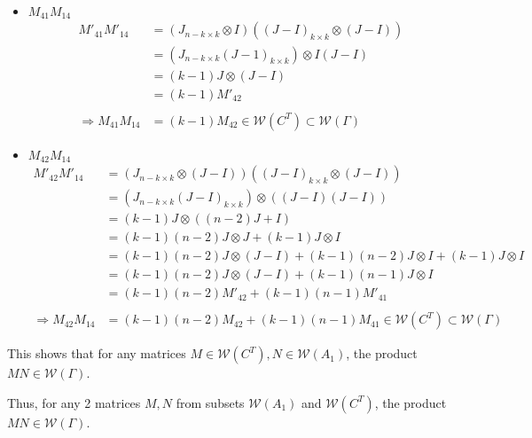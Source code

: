 \documentclass{article}
\begin{document}
\begin{itemize}
\begin{itemize}
\begin{itemize}
            \item $M_{41}M_{14}$ \\
            \begin{align*}
                M'_{41}M'_{14}
                &= (J_{n-k\times k}\otimes I)((J-I)_{k\times k}\otimes (J-I)) \\
                &= (J_{n-k\times k}(J-1)_{k\times k})\otimes I(J-I) \\
                &= (k-1)J\otimes (J-I)\\
                &= (k-1)M'_{42} \\ \\
                \Rightarrow M_{41}M_{14} &= (k-1)M_{42} \in \mathcal{W}(C^T) \subset \mathcal{W}(\Gamma)
            \end{align*}

            \item $M_{42}M_{14}$ \\
            \begin{align*}
                M'_{42}M'_{14}
                &= (J_{n-k\times k}\otimes (J-I))((J-I)_{k\times k}\otimes (J-I)) \\
                &= (J_{n-k\times k}(J-I)_{k\times k})\otimes((J-I)(J-I)) \\
                &= (k-1)J\otimes((n-2)J + I) \\
                &= (k-1)(n-2)J\otimes J + (k-1)J\otimes I \\
                &= (k-1)(n-2)J\otimes (J-I) +(k-1)(n-2)J\otimes I + (k-1)J\otimes I \\
                &= (k-1)(n-2)J\otimes(J-I) +(k-1)(n-1)J\otimes I \\
                &= (k-1)(n-2)M'_{42} + (k-1)(n-1)M'_{41} \\ \\
                \Rightarrow M_{42}M_{14} &= (k-1)(n-2)M_{42} + (k-1)(n-1)M_{41} \in \mathcal{W}(C^T) \subset \mathcal{W}(\Gamma)
            \end{align*}
        \end{itemize}
        This shows that for any matrices $M\in\mathcal{W}(C^T),N \in \mathcal{W}(A_1)$, the product $MN\in\mathcal{W}(\Gamma)$.
    \end{itemize}
    Thus, for any 2 matrices $M,N$ from subsets $\mathcal{W}(A_1)$ and $\mathcal{W}(C^T)$, the product $MN \in \mathcal{W}(\Gamma)$.


\end{itemize}
\end{document}
